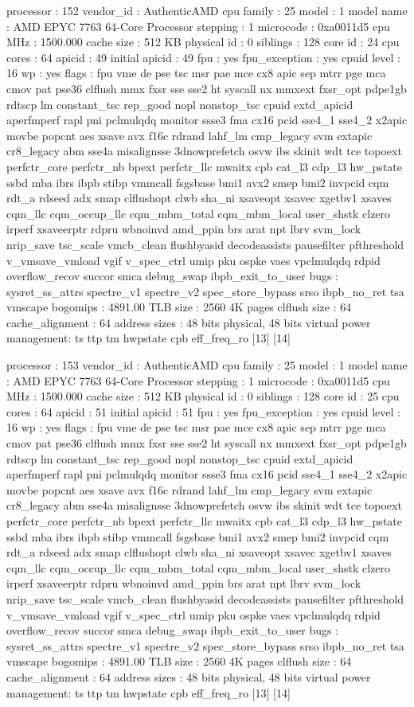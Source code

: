 processor	: 152
vendor_id	: AuthenticAMD
cpu family	: 25
model		: 1
model name	: AMD EPYC 7763 64-Core Processor
stepping	: 1
microcode	: 0xa0011d5
cpu MHz		: 1500.000
cache size	: 512 KB
physical id	: 0
siblings	: 128
core id		: 24
cpu cores	: 64
apicid		: 49
initial apicid	: 49
fpu		: yes
fpu_exception	: yes
cpuid level	: 16
wp		: yes
flags		: fpu vme de pse tsc msr pae mce cx8 apic sep mtrr pge mca cmov pat pse36 clflush mmx fxsr sse sse2 ht syscall nx mmxext fxsr_opt pdpe1gb rdtscp lm constant_tsc rep_good nopl nonstop_tsc cpuid extd_apicid aperfmperf rapl pni pclmulqdq monitor ssse3 fma cx16 pcid sse4_1 sse4_2 x2apic movbe popcnt aes xsave avx f16c rdrand lahf_lm cmp_legacy svm extapic cr8_legacy abm sse4a misalignsse 3dnowprefetch osvw ibs skinit wdt tce topoext perfctr_core perfctr_nb bpext perfctr_llc mwaitx cpb cat_l3 cdp_l3 hw_pstate ssbd mba ibrs ibpb stibp vmmcall fsgsbase bmi1 avx2 smep bmi2 invpcid cqm rdt_a rdseed adx smap clflushopt clwb sha_ni xsaveopt xsavec xgetbv1 xsaves cqm_llc cqm_occup_llc cqm_mbm_total cqm_mbm_local user_shstk clzero irperf xsaveerptr rdpru wbnoinvd amd_ppin brs arat npt lbrv svm_lock nrip_save tsc_scale vmcb_clean flushbyasid decodeassists pausefilter pfthreshold v_vmsave_vmload vgif v_spec_ctrl umip pku ospke vaes vpclmulqdq rdpid overflow_recov succor smca debug_swap ibpb_exit_to_user
bugs		: sysret_ss_attrs spectre_v1 spectre_v2 spec_store_bypass srso ibpb_no_ret tsa vmscape
bogomips	: 4891.00
TLB size	: 2560 4K pages
clflush size	: 64
cache_alignment	: 64
address sizes	: 48 bits physical, 48 bits virtual
power management: ts ttp tm hwpstate cpb eff_freq_ro [13] [14]

processor	: 153
vendor_id	: AuthenticAMD
cpu family	: 25
model		: 1
model name	: AMD EPYC 7763 64-Core Processor
stepping	: 1
microcode	: 0xa0011d5
cpu MHz		: 1500.000
cache size	: 512 KB
physical id	: 0
siblings	: 128
core id		: 25
cpu cores	: 64
apicid		: 51
initial apicid	: 51
fpu		: yes
fpu_exception	: yes
cpuid level	: 16
wp		: yes
flags		: fpu vme de pse tsc msr pae mce cx8 apic sep mtrr pge mca cmov pat pse36 clflush mmx fxsr sse sse2 ht syscall nx mmxext fxsr_opt pdpe1gb rdtscp lm constant_tsc rep_good nopl nonstop_tsc cpuid extd_apicid aperfmperf rapl pni pclmulqdq monitor ssse3 fma cx16 pcid sse4_1 sse4_2 x2apic movbe popcnt aes xsave avx f16c rdrand lahf_lm cmp_legacy svm extapic cr8_legacy abm sse4a misalignsse 3dnowprefetch osvw ibs skinit wdt tce topoext perfctr_core perfctr_nb bpext perfctr_llc mwaitx cpb cat_l3 cdp_l3 hw_pstate ssbd mba ibrs ibpb stibp vmmcall fsgsbase bmi1 avx2 smep bmi2 invpcid cqm rdt_a rdseed adx smap clflushopt clwb sha_ni xsaveopt xsavec xgetbv1 xsaves cqm_llc cqm_occup_llc cqm_mbm_total cqm_mbm_local user_shstk clzero irperf xsaveerptr rdpru wbnoinvd amd_ppin brs arat npt lbrv svm_lock nrip_save tsc_scale vmcb_clean flushbyasid decodeassists pausefilter pfthreshold v_vmsave_vmload vgif v_spec_ctrl umip pku ospke vaes vpclmulqdq rdpid overflow_recov succor smca debug_swap ibpb_exit_to_user
bugs		: sysret_ss_attrs spectre_v1 spectre_v2 spec_store_bypass srso ibpb_no_ret tsa vmscape
bogomips	: 4891.00
TLB size	: 2560 4K pages
clflush size	: 64
cache_alignment	: 64
address sizes	: 48 bits physical, 48 bits virtual
power management: ts ttp tm hwpstate cpb eff_freq_ro [13] [14]

